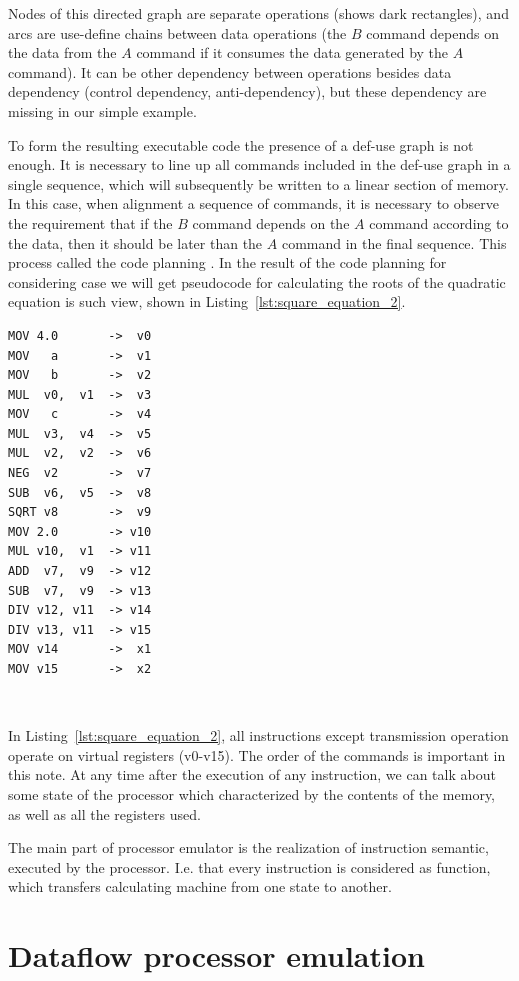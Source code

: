 \documentclass[
11pt,%
tightenlines,%
twoside,%
onecolumn,%
nofloats,%
nobibnotes,%
nofootinbib,%
superscriptaddress,%
noshowpacs,%
centertags]%
{revtex4}
\begin{document}
Nodes of this directed graph are separate operations (shows dark rectangles), and arcs are use-define chains between data operations (the $B$ command depends on the data from the $A$ command if it consumes the data generated by the $A$ command).
It can be other dependency between operations besides data dependency (control dependency, anti-dependency), but these dependency are missing in our simple example.

To form the resulting executable code the presence of a def-use graph is not enough.
It is necessary to line up all commands included in the def-use graph in a single sequence, which will subsequently be written to a linear section of memory.
In this case, when alignment a sequence of commands, it is necessary to observe the requirement that if the $B$ command depends on the $A$ command according to the data, then it should be later than the $A$ command in the final sequence.
This process called the code planning \cite{Aho}.
In the result of the code planning for considering case we will get pseudocode for calculating the roots of the quadratic equation is such view, shown in Listing~\ref{lst:square_equation_2}.

\begin{lstlisting}[caption={Pseudocode for calculating the roots of a quadratic equation.},label={lst:square_equation_2}]
MOV 4.0       ->  v0
MOV   a       ->  v1
MOV   b       ->  v2
MUL  v0,  v1  ->  v3
MOV   c       ->  v4
MUL  v3,  v4  ->  v5
MUL  v2,  v2  ->  v6
NEG  v2       ->  v7
SUB  v6,  v5  ->  v8
SQRT v8       ->  v9
MOV 2.0       -> v10
MUL v10,  v1  -> v11
ADD  v7,  v9  -> v12
SUB  v7,  v9  -> v13
DIV v12, v11  -> v14
DIV v13, v11  -> v15
MOV v14       ->  x1
MOV v15       ->  x2
\end{lstlisting}

\

In Listing~\ref{lst:square_equation_2}, all instructions except transmission operation operate on virtual registers (v0-v15).
The order of the commands is important in this note.
At any time after the execution of any instruction, we can talk about some state of the processor which characterized by the contents of the memory, as well as all the registers used.

The main part of processor emulator is the realization of instruction semantic, executed by the processor.
I.e. that every instruction is considered as function, which transfers calculating machine from one state to another.

\section{Dataflow processor emulation}
\end{document}
